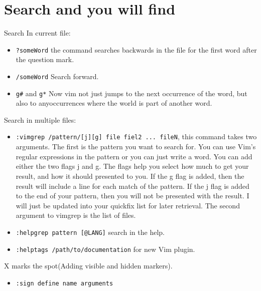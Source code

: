 \documentclass[11pt]{book}
\begin{document}
 \chapter{Search and you will find}
 Search In current file:
 \begin{itemize}
 \item \verb|?someWord| the command searches backwards in the file for the first
 word after the question mark.
 \item \verb|/someWord| Search forward.
 \item \verb|g#| and \verb|g*| Now vim not just jumps to the next occurrence of
 the word, but also to anyoccurrences where the world is part of another word.
 \end{itemize}
 Search in multiple files:
 \begin{itemize}
 \item \verb|:vimgrep /pattern/[j][g] file fiel2 ... fileN|, this command takes
 two arguments. The first is the pattern you want to search for. You can use
 Vim's regular expressions in the pattern or you can just write a word. You can
 add either the two flags j and g. The flags help you select how much to get
 your result, and how it should presented to you. If the g flag is added, then
 the result will include a line for each match of the pattern. If the j flag is
 added to the end of your pattern, then you will not be presented with the
 result. I will just be updated into your quickfix list for later retrieval. The
 second argument to vimgrep is the list of files.
 \item \verb|:helpgrep pattern [@LANG]| search in the help.
 \item \verb|:helptags /path/to/documentation| for new Vim plugin.
 \end{itemize}
 X marks the spot(Adding visible and hidden markers).
 \begin{itemize}
 \item \verb|:sign define name arguments|
 \end{itemize}


 
 
\end{document}
